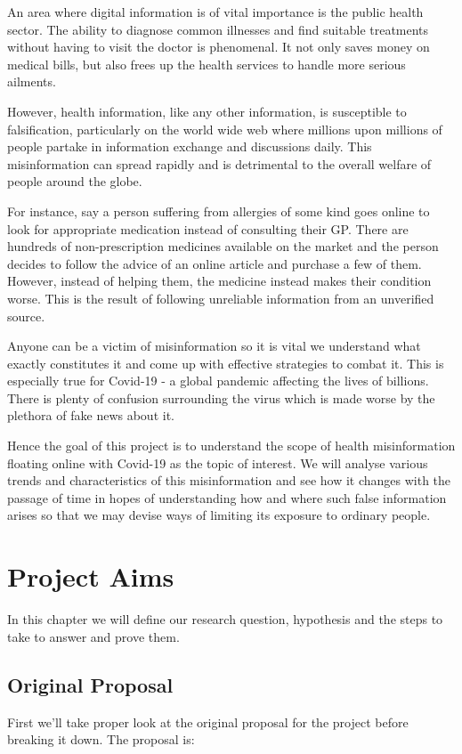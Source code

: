 \documentclass{l4proj}
\begin{document}
An area where digital information is of vital importance is the public health sector. The ability to diagnose common illnesses and find suitable treatments without having to visit the doctor is phenomenal. It not only saves money on medical bills, but also frees up the health services to handle more serious ailments.

However, health information, like any other information, is susceptible to falsification, particularly on the world wide web where millions upon millions of people partake in information exchange and discussions daily. This misinformation can spread rapidly and is detrimental to the overall welfare of people around the globe.

For instance, say a person suffering from allergies of some kind goes online to look for appropriate medication instead of consulting their GP. There are hundreds of non-prescription medicines available on the market and the person decides to follow the advice of an online article and purchase a few of them. However, instead of helping them, the medicine instead makes their condition worse. This is the result of following unreliable information from an unverified source.

Anyone can be a victim of misinformation so it is vital we understand what exactly constitutes it and come up with effective strategies to combat it. This is especially true for Covid-19 - a global pandemic affecting the lives of billions. There is plenty of confusion surrounding the virus which is made worse by the plethora of fake news about it.

Hence the goal of this project is to understand the scope of health misinformation floating online with Covid-19 as the topic of interest. We will analyse various trends and characteristics of this misinformation and see how it changes with the passage of time in hopes of understanding how and where such false information arises so that we may devise ways of limiting its exposure to ordinary people. 


\chapter{Project Aims}
In this chapter we will define our research question, hypothesis and the steps to take to answer and prove them.

\section{Original Proposal}
First we'll take proper look at the original proposal for the project before breaking it down. The proposal is:
\end{document}
